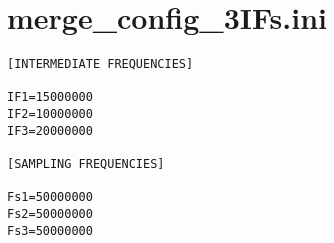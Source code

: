 \section{merge\_config\_3IFs.ini}
\begin{lstlisting}
[INTERMEDIATE FREQUENCIES]

IF1=15000000
IF2=10000000
IF3=20000000

[SAMPLING FREQUENCIES]

Fs1=50000000
Fs2=50000000
Fs3=50000000

\end{lstlisting}



